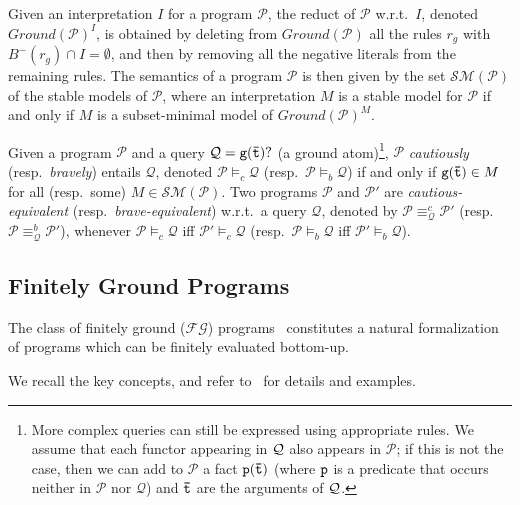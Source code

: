 \documentclass{tlp}
\newcommand{\nop}[1]{}
\newcommand{\p}{\ensuremath{{\mathcal{P}}}}
\newcommand{\GP}{\ensuremath{Ground(\p)}}
\newcommand{\R}{\ensuremath{r}}
\newcommand{\q}{\ensuremath{{\cal Q}}}
\newcommand{\ground}[1]{\ensuremath{Ground(#1)}}
\newcommand{\bravecons}{\ensuremath{\models_b}}
\newcommand{\cautiouscons}{\ensuremath{\models_c}}
\newcommand{\negbody}[1]{\ensuremath{B^-(#1)}}
\renewcommand{\P}{\mathcal{P}}
\newcommand{\Q}{\mathcal{Q}}
\newcommand{\SM}{\mathcal{SM}}
\newcommand{\qrelation}[3]{\ensuremath{{#1}_{#2}^{#3}}}
\newcommand{\qequiv}[2]{\ensuremath{\qrelation{\equiv}{#1}{#2}}}
\newcommand{\bqequiv}[1]{\ensuremath{\qequiv{#1}{b}}}
\newcommand{\cqequiv}[1]{\ensuremath{\qequiv{#1}{c}}}
\renewcommand{\t}{\bar t}
\newcommand{\fg}{$\mathcal{FG}$\xspace}
\newcommand{\dquo}[1]{``#1"}
\begin{document}
Given an interpretation $I$ for a program $\P$, the reduct of $\P$ w.r.t.\ $I$,
denoted $\ground{\p}^{I}$, is obtained by deleting from $\GP$ all 
the rules $\R_g$ with $\negbody{\R_g} \cap I = \emptyset$,
and then by removing all the negative literals from the remaining rules.
The semantics of a program $\P$ is then given by the set $\SM(\P)$ of the stable models of
$\P$, where an interpretation $M$ is a stable model for $\P$ if and only if
$M$ is a subset-minimal model of $\ground{\P}^M$.

Given a program $\p$ and a query $\Q = {\tt g(\t)?}$ (a ground atom)\footnote{More complex queries can still be expressed using appropriate rules.
We assume that each functor appearing in $\q$ also appears in $\p$;
if this is not the case, then we can add to $\p$ a fact $\tt p(\t)$
(where $\tt p$ is a predicate that occurs neither in $\p$ nor $\Q$)
and $\tt \t$ are the arguments of $\q$.}, 
$\p$ {\em cautiously} (resp.\ {\em bravely}) entails $\Q$, denoted $\p \cautiouscons \Q$ (resp.\ $\p \bravecons \Q$) if and only if
${\tt g(\t)} \in M$ for all (resp.\ some) $M \in \SM(\P)$.
Two programs $\p$ and $\p'$ are \emph{cautious-equivalent} (resp.\ \emph{brave-equivalent}) 
w.r.t.\ a query $\Q$, 
denoted by $\P\cqequiv{\Q} \P'$ (resp.\ $\P\bqequiv{\Q} \P'$), 
whenever $\p \cautiouscons \Q$ iff $\p' \cautiouscons \Q$
(resp.\ $\p \bravecons \Q$ iff $\p' \bravecons \Q$).

\subsection{Finitely Ground Programs}\label{subsec:fg_programs}
The class of finitely ground (\fg)
programs~\cite{cali-etal-2008-iclp} constitutes a natural
formalization of programs which can be finitely evaluated bottom-up.
\nop{Informally, the definition of finitely ground program relies on
the so-called \dquo{intelligent instantiation}, obtained by
means of an operator which is iteratively applied on program's
submodules, producing sets of ground rules. In order to
properly split a given program $\p$ into modules, it is taken
in consideration the {\em dependency graph} and the {\em
component graph}. The first connects predicate names, 
while the latter connects strongly
connected components of the former. Each module corresponds to
a strongly connected component (SCC)\footnote{We recall here
that a strongly connected component of a directed graph is a
maximal subset $C$ of the vertices, such that each vertex in
$C$ is reachable from all other vertices in $C$.} of the
dependency graph. An ordering relation is then defined among
modules/components: a {\em component ordering} $\gamma$ for
$\p$ is a total ordering such that the intelligent
instantiation $\p^\gamma$, obtained iteratively by following the
sequence given by $\gamma$, has the same stable models of
$\GP$.



For the sake of clarity, we shortly recall here some key
concepts introduced in~\cite{cali-etal-2008-iclp}. 
For complete formal definitions,
more details and examples, we refer the reader to the
aforementioned paper. 
}
We recall the key concepts, and refer to~\cite{cali-etal-2008-iclp} for details and examples.
\end{document}
